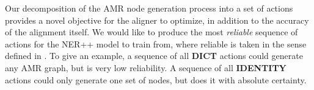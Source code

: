 Our decomposition of the AMR node generation process into a set of actions 
  provides a novel objective for the aligner to optimize, in addition to the
  accuracy of the alignment itself.
We would like to produce the most \textit{reliable}
  sequence of actions for the NER++ model to train from, where reliable is taken
  in the sense defined in .
To give an example, a sequence of all \textbf{DICT} actions could generate any
  AMR graph, but is very low reliability.
A sequence of all \textbf{IDENTITY} actions could only generate one set of nodes, but does it with absolute certainty.




